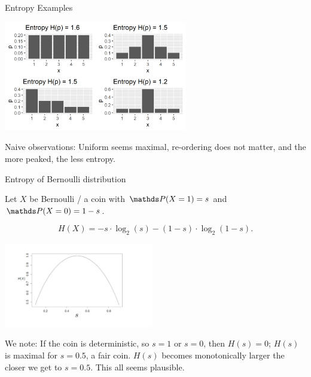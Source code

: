 \documentclass[11pt,compress,t,notes=noshow, xcolor=table]{beamer}
\begin{document}
\begin{vbframe}{Entropy Examples}
    
\begin{center}
\includegraphics[width = 8cm ]{figure/entropy_plot.png} \\
\end{center}

Naive observations: Uniform seems maximal, re-ordering does not matter, and the more peaked, the less entropy.
\end{vbframe}

\begin{vbframe}{Entropy of Bernoulli distribution}

Let $X$ be Bernoulli / a coin with $\P(X=1) = s$ and $\P(X=0) = 1 - s$.

$$ H(X)= -s \cdot \log_2(s)-(1-s)\cdot \log_2(1-s). $$

\begin{center}
\includegraphics[width = 6.5cm ]{figure_man/coin-entropy.png} \\
\end{center}

We note: If the coin is deterministic, so $s=1$ or $s=0$, then $H(s)=0$; 
$H(s)$ is maximal for $s = 0.5$, a fair coin. 
$H(s)$ becomes monotonically larger the closer we get to $s=0.5$.
This all seems plausible.

\end{vbframe}
  
\end{document}
